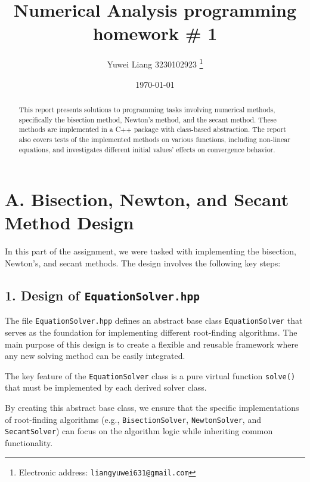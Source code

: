 \documentclass[a4paper]{article}
\begin{document}
\title{Numerical Analysis  programming homework \# 1}

\author{Yuwei Liang 3230102923
  \thanks{Electronic address: \texttt{liangyuwei631@gmail.com}}}


\date{\today}

\maketitle

\begin{abstract}
  This report presents solutions to programming tasks involving numerical methods, specifically the bisection method, Newton's method, and the secant method. These methods are implemented in a C++ package with class-based abstraction. The report also covers tests of the implemented methods on various functions, including non-linear equations, and investigates different initial values' effects on convergence behavior.
\end{abstract}

\section*{A. Bisection, Newton, and Secant Method Design}

In this part of the assignment, we were tasked with implementing the bisection, Newton's, and secant methods. The design involves the following key steps:

\subsection*{1. Design of \texttt{EquationSolver.hpp}}
The file \texttt{EquationSolver.hpp} defines an abstract base class \texttt{EquationSolver} that serves as the foundation for implementing different root-finding algorithms. The main purpose of this design is to create a flexible and reusable framework where any new solving method can be easily integrated.

The key feature of the \texttt{EquationSolver} class is a pure virtual function \texttt{solve()} that must be implemented by each derived solver class.

By creating this abstract base class, we ensure that the specific implementations of root-finding algorithms (e.g., \texttt{BisectionSolver}, \texttt{NewtonSolver}, and \texttt{SecantSolver}) can focus on the algorithm logic while inheriting common functionality.
\end{document}
